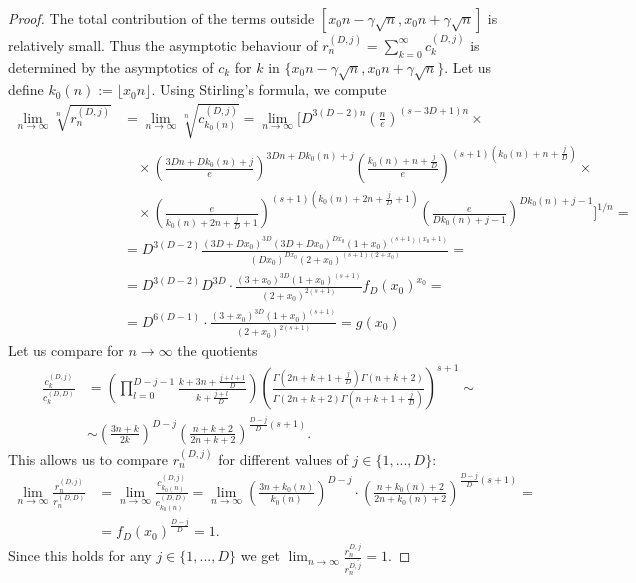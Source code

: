 \documentclass[11pt]{amsart}
\theoremstyle{plain}
\theoremstyle{remark}
\theoremstyle{definition}
\begin{document}
\begin{proof}
	The total contribution of the terms outside $[x_0n-\gamma\sqrt{n}, x_0n+\gamma\sqrt{n}]$ is relatively small. Thus the asymptotic behaviour of $r_n^{(D,j)}=\sum_{k=0}^\infty c_k^{(D,j)}$ is determined by the asymptotics of $c_k$ for $k$ in $\{ x_0n-\gamma\sqrt{n},x_0n+\gamma\sqrt{n} \}$. Let us define $k_0(n):= \lfloor x_0n \rfloor$. Using Stirling's formula, we compute
	\begin{align*}
		\lim_{n\rightarrow\infty } \sqrt[n]{r_n^{(D,j)}}&=\lim_{n\rightarrow\infty } \sqrt[n]{c_{k_0(n)}^{(D,j)}}=\lim_{n\rightarrow\infty } \Big[D^{3(D-2)n}\left(\frac{n}{e}\right)^{(s-3D+1)n} \times \\
		&\quad \times \left(\frac{3Dn+Dk_0(n)+j}{e}\right)^{3Dn+Dk_0(n)+j}\left(\frac{k_0(n)+n+\frac{j}{D}}{e}\right)^{(s+1)(k_0(n)+n+\frac{j}{D})} \times\\
		&\quad  \times \left(\frac{e}{k_0(n)+2n+\frac{j}{D}+1}\right)^{(s+1)(k_0(n)+2n+\frac{j}{D}+1)} \left(\frac{e}{Dk_0(n)+j-1}\right)^{Dk_0(n)+j-1}  \Big]^{1/n}=\\
		&=D^{3(D-2)}\frac{(3D+Dx_0)^{3D}(3D+Dx_0)^{Dx_0}(1+x_0)^{(s+1)(x_0+1)}}{(Dx_0)^{Dx_0}(2+x_0)^{(s+1)(2+x_0)}}=\\
		&=D^{3(D-2)}D^{3D}\cdot \frac{(3+x_0)^{3D}(1+x_0)^{(s+1)}}{(2+x_0)^{2(s+1)}}f_D(x_0)^{x_0}=\\
		&=D^{6(D-1)}\cdot \frac{(3+x_0)^{3D}(1+x_0)^{(s+1)}}{(2+x_0)^{2(s+1)}}=g(x_0)
	\end{align*}
	Let us compare for $n\rightarrow\infty$ the quotients
\begin{align*}
	\frac{c_k^{(D,j)}}{c_k^{(D,D)}}&=\left(\prod_{l=0}^{D-j-1}\frac{k+3n+\frac{j+l+1}{D}}{k+\frac{j+l}{D}}\right)\left(\frac{\Gamma(2n+k+1+\frac{j}{D})\Gamma(n+k+2)}{\Gamma(2n+k+2)\Gamma(n+k+1+\frac{j}{D})}\right)^{s+1}\sim\\
	&\sim \left(\frac{3n+k}{2k}\right)^{D-j}\left( \frac{n+k+2}{2n+k+2}\right)^{\frac{D-j}{D}(s+1)}.
\end{align*}
	This allows us to compare $r_n^{(D,j)}$ for different values of $j\in\{1,...,D\}$:
	\begin{align*}
		\lim_{n\rightarrow\infty } \frac{r_n^{(D,j)}}{r_n^{(D,D)}}&=\lim_{n\rightarrow\infty } \frac{c_{k_0(n)}^{(D,j)}}{c_{k_0(n)}^{(D,D)}}=\lim_{n\rightarrow\infty } \left( \frac{3n+k_0(n)}{k_0(n)} \right)^{D-j}\cdot \left( \frac{n+k_0(n)+2}{2n+k_0(n)+2} \right)^{\frac{D-j}{D}(s+1)}=\\
		&=f_D(x_0)^{\frac{D-j}{D}}=1.
	\end{align*}
	Since this holds for any $j\in\{1,...,D\}$ we get $\lim_{n\rightarrow \infty}\frac{r^{D,j}_n}{r^{D,\tilde{j}}_n}=1$.
\end{proof}
\end{document}
